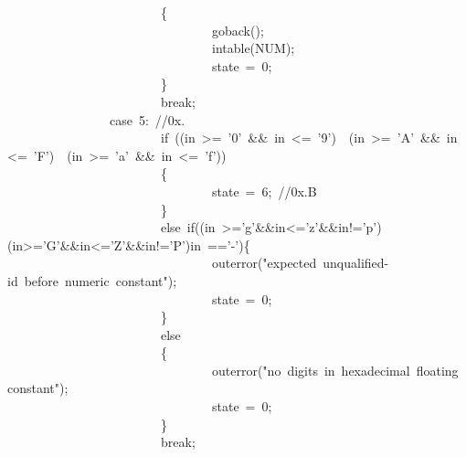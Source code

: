 \documentclass{article}
\begin{document}
\begin{mdpre}
~~~~~~~~~~~~~~~~~~~~~~~~\{\\
~~~~~~~~~~~~~~~~~~~~~~~~~~~~~~~~goback();\\
~~~~~~~~~~~~~~~~~~~~~~~~~~~~~~~~intable({NUM});\\
~~~~~~~~~~~~~~~~~~~~~~~~~~~~~~~~state~=~{0};\\
~~~~~~~~~~~~~~~~~~~~~~~~\}\\
~~~~~~~~~~~~~~~~~~~~~~~~{break};\\
~~~~~~~~~~~~~~~~{case}~{5}:~{//0x.}\\
~~~~~~~~~~~~~~~~~~~~~~~~{if}~((in~\textgreater{}=~{'0'}~\&\&~in~\textless{}=~{'9'})~\textbar{}\textbar{}~(in~\textgreater{}=~{'A'}~\&\&~in~\textless{}=~{'F'})~\textbar{}\textbar{}~(in~\textgreater{}=~{'a'}~\&\&~in~\textless{}=~{'f'}))\\
~~~~~~~~~~~~~~~~~~~~~~~~\{\\
~~~~~~~~~~~~~~~~~~~~~~~~~~~~~~~~state~=~{6};~{//0x.B}\\
~~~~~~~~~~~~~~~~~~~~~~~~\}\\
~~~~~~~~~~~~~~~~~~~~~~~~{else}~{if}((in~\textgreater{}={'g'}\&\&in\textless{}={'z'}\&\&in!={'p'})\textbar{}\textbar{}(in\textgreater{}={'G'}\&\&in\textless{}={'Z'}\&\&in!={'P'})\textbar{}\textbar{}in~=={'-'})\{\\
~~~~~~~~~~~~~~~~~~~~~~~~~~~~~~~~outerror({"}{expected~unqualified-id~before~numeric~constant}{"});\\
~~~~~~~~~~~~~~~~~~~~~~~~~~~~~~~~state~=~{0};\\
~~~~~~~~~~~~~~~~~~~~~~~~\}\\
~~~~~~~~~~~~~~~~~~~~~~~~{else}\\
~~~~~~~~~~~~~~~~~~~~~~~~\{\\
~~~~~~~~~~~~~~~~~~~~~~~~~~~~~~~~outerror({"}{no~digits~in~hexadecimal~floating~constant}{"});\\
~~~~~~~~~~~~~~~~~~~~~~~~~~~~~~~~state~=~{0};\\
~~~~~~~~~~~~~~~~~~~~~~~~\}\\
~~~~~~~~~~~~~~~~~~~~~~~~{break};\\

\end{mdpre}
\end{document}
